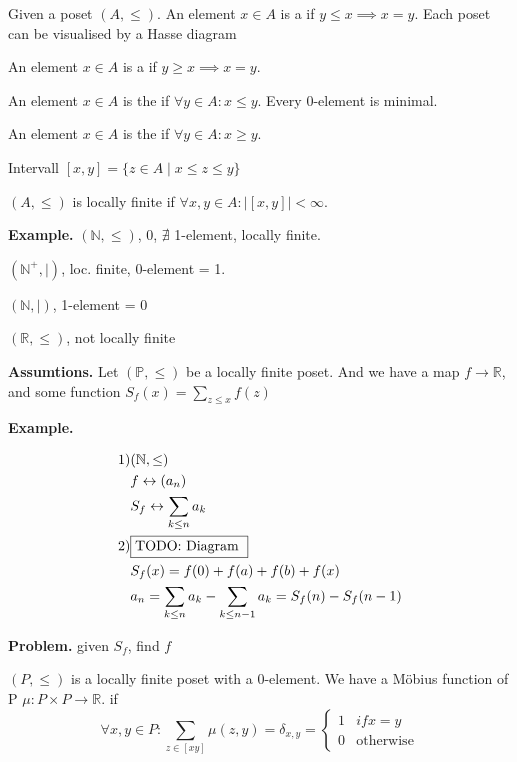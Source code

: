 \begin{definition}
Given a poset $(A, \leq)$. 
An element $x \in A$ is a  if $y \leq x \implies x=y$. 
Each poset can be visualised by a Hasse diagram


An element $x \in A$ is a  if $y \geq x \implies x=y$. 

An element $x \in A$ is the  if $\forall y \in A : x \leq y$. 
Every 0-element is minimal. 

An element $x \in A$ is the  if $\forall y \in A : x \geq y$.

Intervall $[x,y] = \{z \in A \mid x \leq z \leq y\}$

$(A, \leq)$ is locally finite if $\forall x,y \in A: | [x,y]| < \infty$. 
\end{definition}

\textbf{Example.}
$(\mathbb{N}, \leq)$, 0, $\nexists$ 1-element, locally finite. 

$(\mathbb{N}^{+}, \mid)$, loc. finite, 0-element = 1. 

$(\mathbb{N}, \mid)$, 1-element = 0

$(\mathbb{R}, \leq)$, not locally finite

\textbf{Assumtions.}
Let $(\mathbb{P}, \leq)$ be a locally finite poset. And we have a map $f \rightarrow \mathbb{R}$, and some function $S_f(x) = \sum_{z \leq x} f(z)$

\textbf{Example.}

\begin{align*}
  \text{1)} 
    & (\mathbb{N}, \leq) \\
    & f \leftrightarrow (a_n) \\
    & S_f \leftrightarrow \sum_{k\leq n} a_k \\
  \text{2)} & \fbox{TODO: Diagram } \\
    & S_f(x) = f(0) + f(a) + f(b) + f(x) \\
    & a_n = \sum_{k \leq n} a_k - \sum_{k \leq n-1} a_k = S_f(n) - S_f(n-1)
\end{align*}

\textbf{Problem.}
given $S_f$, find $f$

\begin{definition}
$(P, \leq)$ is a locally finite poset with a 0-element. 
We have a Möbius function of P $\mu: P\times P \rightarrow \mathbb{R}$. 
if 
\[
  \forall x,y \in P: \sum_{z\in [xy]} \mu(z,y) = \delta_{x,y} = 
    \begin{cases}
      1 & if x = y \\ 
      0 & \text{otherwise}
    \end{cases}
\]
\end{definition}

